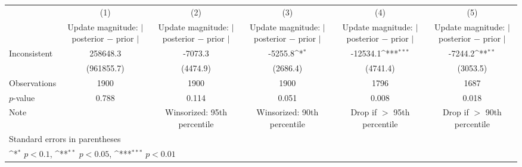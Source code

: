 {
\def\sym#1{\ifmmode^{#1}\else\(^{#1}\)\fi}
\begin{tabular}{l*{5}{c}}
\hline\hline
                    &\multicolumn{1}{c}{(1)}         &\multicolumn{1}{c}{(2)}         &\multicolumn{1}{c}{(3)}         &\multicolumn{1}{c}{(4)}         &\multicolumn{1}{c}{(5)}         \\
                    &\shortstack{Update magnitude: \\ $|$ posterior $-$ prior $|$}         &\shortstack{Update magnitude: \\ $|$ posterior $-$ prior $|$}         &\shortstack{Update magnitude: \\ $|$ posterior $-$ prior $|$}         &\shortstack{Update magnitude: \\ $|$ posterior $-$ prior $|$}         &\shortstack{Update magnitude: \\ $|$ posterior $-$ prior $|$}         \\
\hline
Inconsistent        &    258648.3         &     -7073.3         &     -5255.8\sym{*}  &    -12534.1\sym{***}&     -7244.2\sym{**} \\
                    &  (961855.7)         &    (4474.9)         &    (2686.4)         &    (4741.4)         &    (3053.5)         \\
\hline
Observations        &        1900         &        1900         &        1900         &        1796         &        1687         \\
$p$-value           &       0.788         &       0.114         &       0.051         &       0.008         &       0.018         \\
Note                &                     &Winsorized: 95th percentile         &Winsorized: 90th percentile         &Drop if $>$ 95th percentile         &Drop if $>$ 90th percentile         \\
\hline\hline
\multicolumn{6}{l}{\footnotesize Standard errors in parentheses}\\
\multicolumn{6}{l}{\footnotesize \sym{*} \(p<0.1\), \sym{**} \(p<0.05\), \sym{***} \(p<0.01\)}\\
\end{tabular}
}
